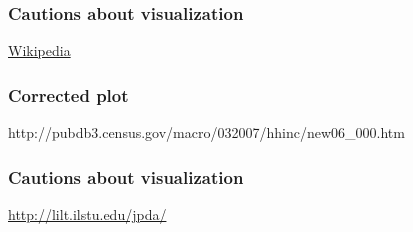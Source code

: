 \documentclass[handout]{beamer}
\begin{document}

   \begin{frame} \frametitle{Cautions about visualization}

   \begin{figure}
   \centering
   \end{figure}

   \href{http://en.wikipedia.org/wiki/Household_income_in_the_United_States}{Wikipedia}
   \end{frame}



   \begin{frame}
   \frametitle{Corrected plot}
   \begin{center}
   \end{center}
   http://pubdb3.census.gov/macro/032007/hhinc/new06_000.htm
   \end{frame}


   \begin{frame} \frametitle{Cautions about visualization}

   \begin{figure}
   \centering
   \end{figure}

   \href{http://lilt.ilstu.edu/jpda/}{http://lilt.ilstu.edu/jpda/}
   \end{frame}
\end{document}

